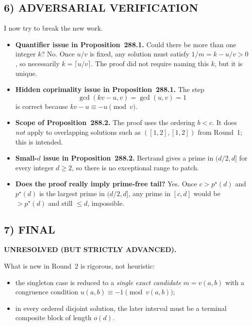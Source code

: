\subsection*{6) ADVERSARIAL VERIFICATION}
I now try to break the new work.

\begin{itemize}
	\item \textbf{Quantifier issue in Proposition~288.1.} Could there be more than one integer $k$? No. Once $u/v$ is fixed, any solution must satisfy $1/m=k-u/v>0$, so necessarily $k=\lceil u/v\rceil$. The proof did not require naming this $k$, but it is unique.
	
	\item \textbf{Hidden coprimality issue in Proposition~288.1.} The step
	\[
	\gcd(kv-u,v)=\gcd(u,v)=1
	\]
	is correct because $kv-u\equiv -u\pmod v$.
	
	\item \textbf{Scope of Proposition~288.2.} The proof uses the ordering $b<c$. It does \emph{not} apply to overlapping solutions such as $([1,2],[1,2])$ from Round~1; this is intended.
	
	\item \textbf{Small-$d$ issue in Proposition~288.2.} Bertrand gives a prime in $(d/2,d]$ for every integer $d\ge 2$, so there is no exceptional range to patch.
	
	\item \textbf{Does the proof really imply prime-free tail?} Yes. Once $c>p^\star(d)$ and $p^\star(d)$ is the largest prime in $(d/2,d]$, any prime in $[c,d]$ would be $>p^\star(d)$ and still $\le d$, impossible.
\end{itemize}

\subsection*{7) FINAL}
\textbf{UNRESOLVED (BUT STRICTLY ADVANCED).}

What is new in Round~2 is rigorous, not heuristic:

\begin{itemize}
	\item the singleton case is reduced to a \emph{single exact candidate} $m=v(a,b)$ with a congruence condition $u(a,b)\equiv -1\pmod{v(a,b)}$;
	\item in every ordered disjoint solution, the later interval must be a terminal composite block of length $o(d)$.
\end{itemize}

